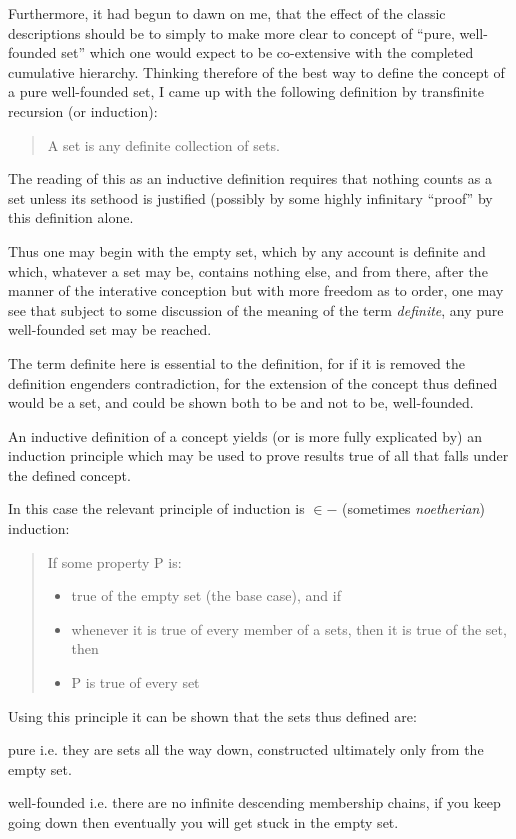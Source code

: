\documentclass[10pt,titlepage]{book}
\begin{document}
Furthermore, it had begun to dawn on me, that the effect of the classic descriptions should be to simply to make more clear to concept of ``pure, well-founded set'' which one would expect to be co-extensive with the completed cumulative hierarchy.
Thinking therefore of the best way to define the concept of a pure well-founded set, I came up with the following definition by transfinite recursion (or induction):

\begin{quote}
A set is any definite collection of sets.
\end{quote}

The reading of this as an inductive definition requires that nothing counts as a set unless its sethood is justified (possibly by some highly infinitary ``proof'' by this definition alone.

Thus one may begin with the empty set, which by any account is definite and which, whatever a set may be, contains nothing else, and from there, after the manner of the interative conception but with more freedom as to order, one may see that subject to some discussion of the meaning of the term {\it definite}, any pure well-founded set may be reached.

The term definite here is essential to the definition, for if it is removed the definition engenders contradiction, for the extension of the concept thus defined would be a set, and could be shown both to be and not to be, well-founded.

An inductive definition of a concept yields (or is more fully explicated by) an induction principle which may be used to prove results true of all that falls under the defined concept.

In this case the relevant principle of induction is $\in-$ (sometimes {\it noetherian}) induction:

\begin{quote}
If some property P is:
\begin{itemize}
\item true of the empty set (the base case), and if
\item whenever it is true of every member of a sets, then it is true of the set, then
\item P is true of every set
\end{itemize}
\end{quote}

Using this principle it can be shown that the sets thus defined are:

\begin{compactdesc}
\item[pure] i.e. they are sets all the way down, constructed ultimately only from the empty set.
\item[well-founded] i.e. there are no infinite descending membership chains, if you keep going down then eventually you will get stuck in the empty set.
\end{compactdesc}
\end{document}
